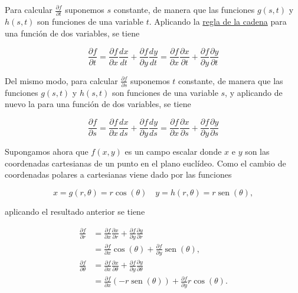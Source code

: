 \documentclass[
  a4paper,
]{scrreport}
\theoremstyle{definition}
\theoremstyle{remark}
\begin{document}
\begin{tcolorbox}[enhanced jigsaw, coltitle=black, toptitle=1mm, colframe=quarto-callout-tip-color-frame, colbacktitle=quarto-callout-tip-color!10!white, breakable, opacityback=0, bottomtitle=1mm, opacitybacktitle=0.6, title=\textcolor{quarto-callout-tip-color}{\faLightbulb}\hspace{0.5em}{Solución}, arc=.35mm, leftrule=.75mm, toprule=.15mm, titlerule=0mm, bottomrule=.15mm, left=2mm, rightrule=.15mm, colback=white]

Para calcular \(\frac{\partial f}{\partial t}\) suponemos \(s\)
constante, de manera que las funciones \(g(s,t)\) y \(h(s,t)\) son
funciones de una variable \(t\). Aplicando la
\href{https://aprendeconalf.es/analisis-manual/13-derivadas-funciones-varias-variables.html\#regla-de-la-cadena}{regla
de la cadena} para una función de dos variables, se tiene

\[
\frac{\partial f}{\partial t} 
= \frac{\partial f}{\partial x}\frac{dx}{dt} + \frac{\partial f}{\partial y}\frac{dy}{dt} 
= \frac{\partial f}{\partial x}\frac{\partial x}{\partial t} + \frac{\partial f}{\partial y}\frac{\partial y}{\partial t}
\]

Del mismo modo, para calcular \(\frac{\partial f}{\partial s}\)
suponemos \(t\) constante, de manera que las funciones \(g(s,t)\) y
\(h(s,t)\) son funciones de una variable \(s\), y aplicando de nuevo la
para una función de dos variables, se tiene

\[
\frac{\partial f}{\partial s} 
= \frac{\partial f}{\partial x}\frac{dx}{ds} + \frac{\partial f}{\partial y}\frac{dy}{ds} 
= \frac{\partial f}{\partial x}\frac{\partial x}{\partial s} + \frac{\partial f}{\partial y}\frac{\partial y}{\partial s}
\]

Supongamos ahora que \(f(x,y)\) es un campo escalar donde \(x\) e \(y\)
son las coordenadas cartesianas de un punto en el plano euclídeo. Como
el cambio de coordenadas polares a cartesianas viene dado por las
funciones

\[
x = g(r,\theta) = r\cos(\theta) \quad y = h(r,\theta) = r\operatorname{sen}(\theta),
\]

aplicando el resultado anterior se tiene

\begin{align*}
\frac{\partial f}{\partial r} 
&= \frac{\partial f}{\partial x}\frac{\partial x}{\partial r} + \frac{\partial f}{\partial y}\frac{\partial y}{\partial r} \\
&= \frac{\partial f}{\partial x}\cos(\theta) + \frac{\partial f}{\partial y}\operatorname{sen}(\theta), \\
\frac{\partial f}{\partial \theta} 
&= \frac{\partial f}{\partial x}\frac{\partial x}{\partial \theta} + \frac{\partial f}{\partial y}\frac{\partial y}{\partial \theta} \\
&= \frac{\partial f}{\partial x}(-r\operatorname{sen}(\theta)) + \frac{\partial f}{\partial y}r\cos(\theta).
\end{align*}

\end{tcolorbox}
\end{document}
